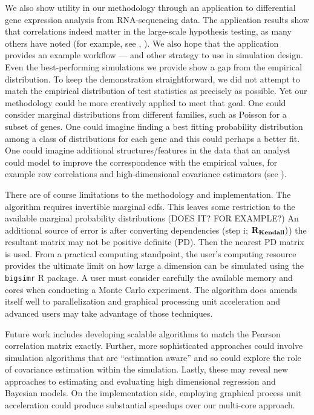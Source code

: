\documentclass[
]{article}
\begin{document}
We also show utility in our methodology through an application to differential gene expression analysis from RNA-sequencing data. The application results show that correlations indeed matter in the large-scale hypothesis testing, as many others have noted (for example, see \citet{BE07}, \citet{Wu2012b}). We also hope that the application provides an example workflow --- and other strategy to use in simulation design. Even the best-performing simulations we provide show a gap from the empirical distribution. To keep the demonstration straightforward, we did not attempt to match the empirical distribution of test statistics as precisely as possible. Yet our methodology could be more creatively applied to meet that goal. One could consider marginal distributions from different families, such as Poisson for a subset of genes. One could imagine finding a best fitting probability distribution among a class of distributions for each gene and this could perhaps a better fit. One could imagine additional structures/features in the data that an analyst could model to improve the correspondence with the empirical values, for example row correlations and high-dimensional covariance estimators (see \citet{Won2013g}).

There are of course limitations to the methodology and implementation. The algorithm requires invertible marginal cdfs. This leaves some restriction to the available marginal probability distributions (DOES IT? FOR EXAMPLE?) An additional source of error is after converting dependencies (step i; \({\bf R_{Kendall}})\)) the resultant matrix may not be positive definite (PD). Then the nearest PD matrix is used. From a practical computing standpoint, the user's computing resource provides the ultimate limit on how large a dimension can be simulated using the \texttt{bigsimr} R package. A user must consider carefully the available memory and cores when conducting a Monte Carlo experiment. The algorithm does amends itself well to parallelization and graphical processing unit acceleration \citep{Li2019gpu} and advanced users may take advantage of those techniques.

Future work includes developing scalable algorithms to match the Pearson correlation matrix exactly. Further, more sophisticated approaches could involve simulation algorithms that are ``estimation aware'' and so could explore the role of covariance estimation within the simulation. Lastly, these may reveal new approaches to estimating and evaluating high dimensional regression and Bayesian models. On the implementation side, employing graphical process unit acceleration could produce substantial speedups over our multi-core approach.
\end{document}
